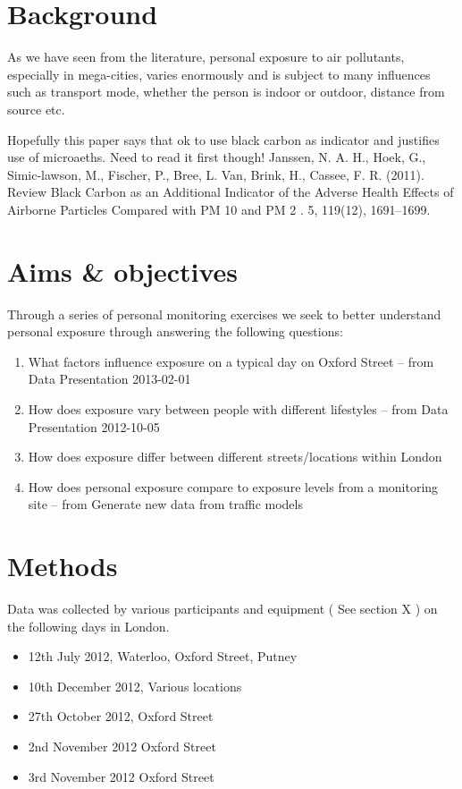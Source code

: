 \section{Background}
\label{sec:c01background}

As we have seen from the literature, personal exposure to air pollutants, especially in mega-cities, varies enormously and is subject to many influences such as transport mode, whether the person is indoor or outdoor, distance from source etc.

Hopefully this paper says that ok to use black carbon as indicator and justifies use of microaeths. Need to read it first though! Janssen, N. A. H., Hoek, G., Simic-lawson, M., Fischer, P., Bree, L. Van, Brink, H., Cassee, F. R. (2011). Review Black Carbon as an Additional Indicator of the Adverse Health Effects of Airborne Particles Compared with PM 10 and PM 2 . 5, 119(12), 1691–1699.

\section{Aims \& objectives}
\label{sec:c01aims_and_objectives}

Through a series of personal monitoring exercises we seek to better understand personal exposure through answering the following questions:


\begin{enumerate}
\item What factors influence exposure on a typical day on Oxford Street -- from Data Presentation 2013-02-01
\item How does exposure vary between people with different lifestyles -- from Data Presentation 2012-10-05
\item How does exposure differ between different streets/locations within London
\item How does personal exposure compare to exposure levels from a monitoring site -- from Generate new data from traffic models
\end{enumerate}

\section{Methods}
\label{sec:c01methods}

Data was collected by various participants and equipment ( See section X ) on the following days in London.

\begin{itemize}
\item 12th July 2012, Waterloo, Oxford Street, Putney
\item 10th December 2012, Various locations
\item 27th October 2012, Oxford Street
\item 2nd November 2012 Oxford Street
\item 3rd November 2012 Oxford Street
\end{itemize}

